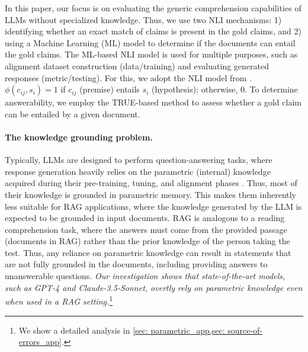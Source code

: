 \documentclass{article} %
\renewcommand{\cite}[1]{\citep{#1}}
\begin{document}
In this paper, our focus is on evaluating the generic comprehension capabilities of LLMs without specialized knowledge. Thus, we use two NLI mechanisms: 1) identifying whether an exact match of claims is present in the gold claims, and 2) using a Machine Learning (ML) model to determine if the documents can entail the gold claims. The ML-based NLI model is used for multiple purposes, such as alignment dataset construction (data/training) and evaluating generated responses (metric/testing). For this, we adopt the NLI model from \citet{rashkin2022measuringattributionnaturallanguage}. \(\phi(c_{ij}, s_i) = 1\) if \(c_{ij}\) (premise) entails \(s_i\) (hypothesis); otherwise, 0. To determine answerability, we employ the TRUE-based method \cite{honovich-etal-2022-true} to assess whether a gold claim can be entailed by a given document.

\paragraph{The knowledge grounding problem.} 
Typically, LLMs are designed to perform question-answering tasks, where response generation heavily relies on the parametric (internal) knowledge acquired during their pre-training, tuning, and alignment phases \cite{openai2023chatgpt, anthropic2024claude}. Thus, most of their knowledge is grounded in parametric memory. This makes them inherently less suitable for RAG applications, where the knowledge generated by the LLM is expected to be grounded in input documents. RAG is analogous to a reading comprehension task, where the answers must come from the provided passage (documents in RAG) rather than the prior knowledge of the person taking the test. Thus, any reliance on parametric knowledge can result in statements that are not fully grounded in the documents, including providing answers to unanswerable questions. \textit{Our investigation shows that state-of-the-art models, such as GPT-4 and Claude-3.5-Sonnet, overtly rely on parametric knowledge even when used in a RAG setting.}\footnote{We show a detailed analysis in \cref{sec: parametric_app,sec: source-of-errors_app}.}
\end{document}
